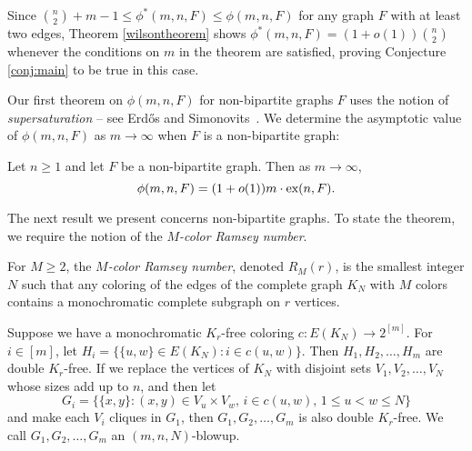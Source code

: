 Since $\binom{n}{2} + m - 1 \leq \phi^*(m, n, F) \leq \phi(m, n, F)$ for any graph $F$ with at least two edges, Theorem \ref{wilsontheorem} shows $\phi^*(m, n, F) = (1 + o(1))\binom{n}{2}$ whenever the conditions on $m$ in the theorem are satisfied, proving Conjecture \ref{conj:main} to be true in this case.

Our first theorem on $\phi(m, n, F)$ for non-bipartite graphs $F$ uses the notion of \textit{supersaturation} -- see Erd\H{o}s and Simonovits~\cite{ErdosSimonovits1983}. We determine the asymptotic value of $\phi(m, n, F)$ as $m \rightarrow \infty$ when $F$ is a non-bipartite graph:

\begin{theorem}\label{thm:asymp}
  Let $n \geq 1$ and let $F$ be a non-bipartite graph. Then as $m \rightarrow \infty$, 
  \[
    \phi(m, n, F) = (1 + o(1))m \cdot \textnormal{ex}(n, F).
  \]
\end{theorem}

The next result we present concerns non-bipartite graphs. To state the theorem, we require the notion of the \textit{$M$-color Ramsey number}. 

\begin{definition}
  For $M \geq 2$, the \textit{$M$-color Ramsey number}, denoted $R_M(r)$, is the smallest integer $N$ such that any coloring of the edges of the complete graph $K_N$ with $M$ colors contains a monochromatic complete subgraph on $r$ vertices.
\end{definition}

Suppose we have a monochromatic $K_r$-free coloring $c : E(K_N) \rightarrow 2^{[m]}$. For $i \in [m]$, let $H_i = \{\{u, w\} \in E(K_N) : i \in c(u, w)\}$. Then $H_1,H_2,\dots,H_m$ are double $K_r$-free. If we replace the vertices of $K_N$ with disjoint sets $V_1, V_2, \ldots, V_N$ whose sizes add up to $n$, and then let
\[ 
  G_i = \{\{x,y\} : (x,y) \in V_u \times V_w, \, i \in c(u, w), \, 1 \leq u < w \leq N\}
\] 
and make each $V_i$ cliques in $G_1$, then $G_1, G_2, \dots, G_m$ is also double $K_r$-free. We call $G_1, G_2, \dots, G_m$ an $(m, n, N)$-blowup. 

